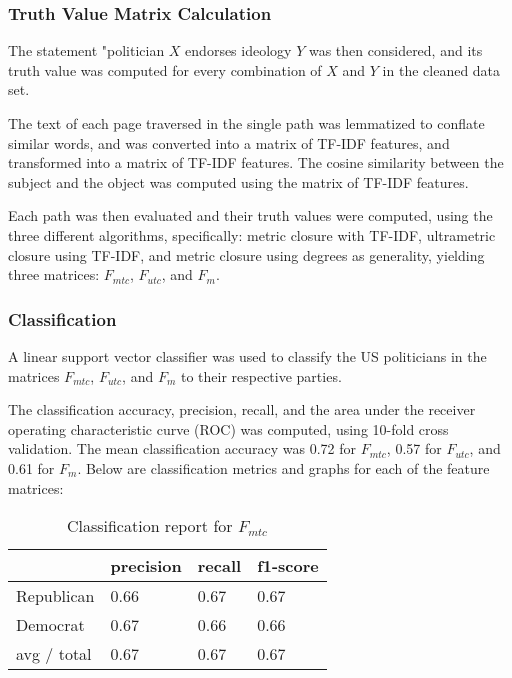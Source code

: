 \documentclass[10pt,11pt,12pt,oneside]{book}
\begin{document}
\subsubsection{Truth Value Matrix Calculation}
The statement "politician $ X $ endorses ideology $ Y $ was then considered, and its truth value was computed for every combination of $ X $ and $ Y $ in the cleaned data set. 

The text of each page traversed in the single path was lemmatized to conflate similar words, and was converted into a matrix of TF-IDF features, and transformed into a matrix of TF-IDF features. The cosine similarity between the subject and the object was computed using the matrix of TF-IDF features.

Each path was then evaluated and their truth values were computed, using the three different algorithms, specifically: metric closure with TF-IDF, ultrametric closure using TF-IDF, and metric closure using degrees as generality, yielding three matrices: $ F_{mtc} $, $ F_{utc} $, and $ F_{m} $. 

\subsubsection{Classification}
A linear support vector classifier was used to classify the US politicians in the matrices $ F_{mtc} $, $ F_{utc} $, and $ F_{m} $ to their respective parties.

The classification accuracy, precision, recall, and the area under the receiver operating characteristic curve (ROC) was computed, using 10-fold cross validation. The mean classification accuracy was 0.72 for $ F_{mtc} $, 0.57 for $ F_{utc} $, and 0.61 for $ F_{m} $. Below are classification metrics and graphs for each of the feature matrices:
\newpage

\vspace*{0.5cm}
\begin{table}[H]
	\begin{tabular}{ | p{5cm} || p{3cm} | p{3cm} | p{3cm} |}
		\hline
		& precision & recall & f1-score\\
		\hline
		Republican & 0.66 & 0.67 & 0.67\\
		\hline
		Democrat & 0.67 & 0.66 & 0.66\\  
		\hline
		avg / total  & 0.67 & 0.67 & 0.67 \\
		\hline
	\end{tabular}
	\caption{Classification report for $ F_{mtc} $}
	\label{cr_metrictfidf}
\end{table}
\end{document}
